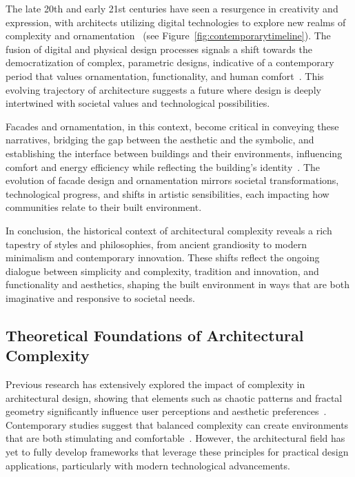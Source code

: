 The late 20th and early 21st centuries have seen a resurgence in creativity and expression, with architects utilizing digital technologies to explore new realms of complexity and ornamentation~\cite{Burlando2019} (see Figure~\ref{fig:contemporarytimeline}).
The fusion of digital and physical design processes signals a shift towards the democratization of complex, parametric designs, indicative of a contemporary period that values ornamentation, functionality, and human comfort~\cite{Schwab2016}.
This evolving trajectory of architecture suggests a future where design is deeply intertwined with societal values and technological possibilities.

Facades and ornamentation, in this context, become critical in conveying these narratives, bridging the gap between the aesthetic and the symbolic, and establishing the interface between buildings and their environments, influencing comfort and energy efficiency while reflecting the building's identity~\cite{Kamal2020}.
The evolution of facade design and ornamentation mirrors societal transformations, technological progress, and shifts in artistic sensibilities, each impacting how communities relate to their built environment.

In conclusion, the historical context of architectural complexity reveals a rich tapestry of styles and philosophies, from ancient grandiosity to modern minimalism and contemporary innovation.
These shifts reflect the ongoing dialogue between simplicity and complexity, tradition and innovation, and functionality and aesthetics, shaping the built environment in ways that are both imaginative and responsive to societal needs.


\subsection{Theoretical Foundations of Architectural Complexity}
\label{subsec:ComplexityStudies}

Previous research has extensively explored the impact of complexity in architectural design, showing that elements such as chaotic patterns and fractal geometry significantly influence user perceptions and aesthetic preferences~\cite{Bies2016}.
Contemporary studies suggest that balanced complexity can create environments that are both stimulating and comfortable~\cite{Redies2015}.
However, the architectural field has yet to fully develop frameworks that leverage these principles for practical design applications, particularly with modern technological advancements.

